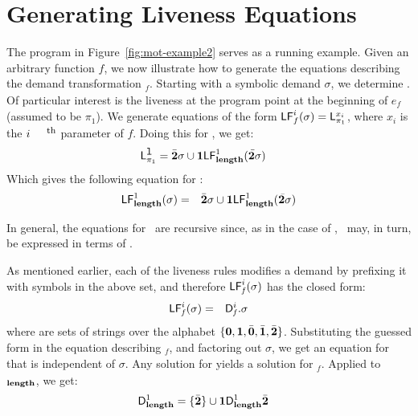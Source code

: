 \documentclass[9pt]{sigplanconf}
\newcommand{\comment}[1]{{\color{Myblue}{(#1)}}}
\begin{document}
\newcommand{\emm}[2]{\ensuremath{\mathcal{#1}_{#2}}}

\section{Generating Liveness Equations}
The  program  in  Figure~\ref{fig:mot-example2}  serves as  a  running
example. Given  an arbitrary function $\mathit{f}$,  we now illustrate
how  to generate  the equations  describing the  demand transformation
\Lfonly$_\mathit{f}$.   Starting with a  symbolic demand  $\sigma$, we
determine   .    Of   particular
interest  is the liveness  at the  program point  at the  beginning of
$e_{\mathit{f}}$ (assumed  to be $\pi_1$).   We generate
equations     of     the     form    $\mathsf{LF}_{\mathit \mathit{f}}^{i}( {\mathit \sigma})     =
\mathsf{L}_{{\pi_1}}^{x_i}$, where  $x_i$ is the  $i^{\mbox{\footnotesize th}}$
parameter of $\mathit{f}$. Doing this for \length, we get:
\begin{align*}
 \mathsf{L}_{{\pi_1}}^{\mbox{\tt l}} &= \bar{\mathbf{2}}\sigma \cup \mathbf{1}\mathsf{LF}_{\mathit {\mathbf{length}}}^{1}( {\mathit {\bar{\mathbf{2}}}\sigma})
\end{align*}
Which gives the following equation for \Lfone{\length}: 
  \begin{eqnarray*}
    \mathsf{LF}_{\mathit {\mathbf{length}}}^{1}( {\mathit \sigma})
    &=& \bar{\mathbf{2}}\sigma \cup \mathbf{1}\mathsf{LF}_{\mathit {\mathbf{length}}}^{1}( {\mathit {\bar{\mathbf{2}}}\sigma})
   \end{eqnarray*}

In general, the equations for  \Lfonly\ are recursive since, as in the
case of \length,  \ may, in turn, be  expressed in terms of
.


As mentioned earlier\comment{Check if already mentioned, Not mentioned earlier}, each of  the liveness rules modifies a demand by
prefixing   it with   symbols   in   the   above   set,   and   therefore
$\mathsf{LF}_{\mathit f}^{i}( {\mathit \sigma})$ has the closed form:
\begin{eqnarray}
\label{eq:LF:DI}
  \mathsf{LF}_{\mathit f}^{i}( {\mathit \sigma}) &=& \mathsf{D}_{\mathit f}^{i}.\sigma
\end{eqnarray}
where  are sets of  strings over the alphabet $\lbrace \mathbf{0},
\mathbf{1},\bar{\mathbf{0}}, \bar{\mathbf{1}}, \bar{\mathbf{2}} \rbrace$.   Substituting the guessed form in
the  equation  describing  \Lfonly$_{\mathit  f}$, and  factoring  out
$\sigma$,  we  get an  equation  for   that is
independent of $\sigma$.  Any solution for  yields a solution
for \Lfonly$_{\mathit f}$.  Applied to \Lfonly$_{\mathit {\mathbf{length}}}$, we
get:
  \begin{align*}
    \mathsf{D}_{\mathit {\mathbf{length}}}^{1} &= \lbrace\bar{\mathbf{2}}\rbrace 
    \cup \mathbf{1}\mathsf{D}_{\mathit {\mathbf{length}}}^{1}\bar{\mathbf{2}}
  \end{align*}
 
\end{document}

